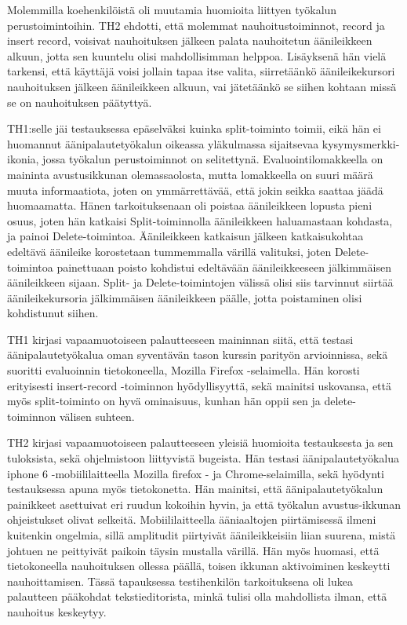 \documentclass[utf8]{gradu3}
\begin{document}
Molemmilla koehenkilöistä oli muutamia huomioita liittyen työkalun perustoimintoihin. TH2 ehdotti, että molemmat nauhoitustoiminnot, record ja insert record, voisivat nauhoituksen jälkeen palata nauhoitetun äänileikkeen alkuun, jotta sen kuuntelu olisi mahdollisimman helppoa. Lisäyksenä hän vielä tarkensi, että käyttäjä voisi jollain tapaa itse valita, siirretäänkö äänileikekursori nauhoituksen jälkeen äänileikkeen alkuun, vai jätetäänkö se siihen kohtaan missä se on nauhoituksen päätyttyä.

TH1:selle jäi testauksessa epäselväksi kuinka split-toiminto toimii, eikä hän ei huomannut äänipalautetyökalun oikeassa yläkulmassa sijaitsevaa kysymysmerkki-ikonia, jossa työkalun perustoiminnot on selitettynä. Evaluointilomakkeella on maininta avustusikkunan olemassaolosta, mutta lomakkeella on suuri määrä muuta informaatiota, joten on ymmärrettävää, että jokin seikka saattaa jäädä huomaamatta. Hänen tarkoituksenaan oli poistaa äänileikkeen lopusta pieni osuus, joten hän katkaisi Split-toiminnolla äänileikkeen haluamastaan kohdasta, ja painoi Delete-toimintoa. Äänileikkeen katkaisun jälkeen katkaisukohtaa edeltävä äänileike korostetaan tummemmalla värillä valituksi, joten Delete-toimintoa painettuaan poisto kohdistui edeltävään äänileikkeeseen jälkimmäisen äänileikkeen sijaan. Split- ja Delete-toimintojen välissä olisi siis tarvinnut siirtää äänileikekursoria jälkimmäisen äänileikkeen päälle, jotta poistaminen olisi kohdistunut siihen.

TH1 kirjasi vapaamuotoiseen palautteeseen maininnan siitä, että testasi äänipalautetyökalua oman syventävän tason kurssin parityön arvioinnissa, sekä suoritti evaluoinnin tietokoneella, Mozilla Firefox -selaimella. Hän korosti erityisesti insert-record -toiminnon hyödyllisyyttä, sekä mainitsi uskovansa, että myös split-toiminto on hyvä ominaisuus, kunhan hän oppii sen ja delete-toiminnon välisen suhteen. 

TH2 kirjasi vapaamuotoiseen palautteeseen yleisiä huomioita testauksesta ja sen tuloksista, sekä ohjelmistoon liittyvistä bugeista. Hän testasi äänipalautetyökalua iphone 6 -mobiililaitteella Mozilla firefox - ja Chrome-selaimilla, sekä hyödynti testauksessa apuna myös tietokonetta. Hän mainitsi, että äänipalautetyökalun painikkeet asettuivat eri ruudun kokoihin hyvin, ja että työkalun avustus-ikkunan ohjeistukset olivat selkeitä. Mobiililaitteella ääniaaltojen piirtämisessä ilmeni kuitenkin ongelmia, sillä amplitudit piirtyivät äänileikkeisiin liian suurena, mistä johtuen ne peittyivät paikoin täysin mustalla värillä. Hän myös huomasi, että tietokoneella nauhoituksen ollessa päällä, toisen ikkunan aktivoiminen keskeytti nauhoittamisen. Tässä tapauksessa testihenkilön tarkoituksena oli lukea palautteen pääkohdat tekstieditorista, minkä tulisi olla mahdollista ilman, että nauhoitus keskeytyy.
\end{document}
